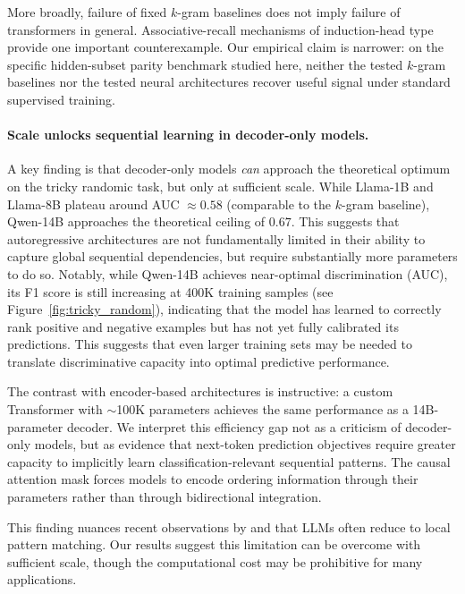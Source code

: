 \documentclass{article}
\theoremstyle{plain}
\theoremstyle{definition}
\theoremstyle{remark}
\begin{document}
More broadly, failure of fixed $k$-gram baselines does not imply failure of transformers in general. Associative-recall mechanisms of induction-head type provide one important counterexample. Our empirical claim is narrower: on the specific hidden-subset parity benchmark studied here, neither the tested $k$-gram baselines nor the tested neural architectures recover useful signal under standard supervised training.

\paragraph{Scale unlocks sequential learning in decoder-only models.}
A key finding is that decoder-only models \emph{can} approach the theoretical optimum on the tricky randomic task, but only at sufficient scale. While Llama-1B and Llama-8B plateau around AUC $\approx 0.58$ (comparable to the $k$-gram baseline), Qwen-14B approaches the theoretical ceiling of $0.67$. This suggests that autoregressive architectures are not fundamentally limited in their ability to capture global sequential dependencies, but require substantially more parameters to do so. Notably, while Qwen-14B achieves near-optimal discrimination (AUC), its F1 score is still increasing at 400K training samples (see Figure~\ref{fig:tricky_random}), indicating that the model has learned to correctly rank positive and negative examples but has not yet fully calibrated its predictions. This suggests that even larger training sets may be needed to translate discriminative capacity into optimal predictive performance.

The contrast with encoder-based architectures is instructive: a custom Transformer with $\sim$100K parameters achieves the same performance as a 14B-parameter decoder. We interpret this efficiency gap not as a criticism of decoder-only models, but as evidence that next-token prediction objectives require greater capacity to implicitly learn classification-relevant sequential patterns. The causal attention mask forces models to encode ordering information through their parameters rather than through bidirectional integration.

This finding nuances recent observations by \citet{nguyen2024understanding} and \citet{kimLostSequenceLarge2025b} that LLMs often reduce to local pattern matching. Our results suggest this limitation can be overcome with sufficient scale, though the computational cost may be prohibitive for many applications.
\end{document}
